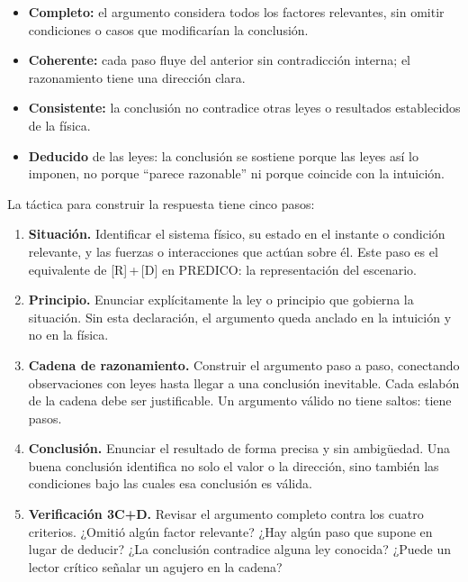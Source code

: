 \documentclass[11pt]{book}
\begin{document}
\medskip
{}
\begin{itemize}
    \item {\bf Completo:} el argumento considera todos los factores relevantes, sin omitir condiciones o casos que modificarían la conclusión.
    \item {\bf Coherente:} cada paso fluye del anterior sin contradicción interna; el razonamiento tiene una dirección clara.
    \item {\bf Consistente:} la conclusión no contradice otras leyes o resultados establecidos de la física.
    \item {\bf Deducido} de las leyes: la conclusión se sostiene porque las leyes así lo imponen, no porque ``parece razonable'' ni porque coincide con la intuición.
\end{itemize}

\medskip
La táctica para construir la respuesta tiene cinco pasos:

\begin{enumerate}
    \item[1.] {\bf Situación.} Identificar el sistema físico, su estado en el instante o condición relevante, y las fuerzas o interacciones que actúan sobre él. Este paso es el equivalente de [R]\,+\,[D] en PREDICO: la representación del escenario.

    \item[2.] {\bf Principio.} Enunciar explícitamente la ley o principio que gobierna la situación. Sin esta declaración, el argumento queda anclado en la intuición y no en la física.

    \item[3.] {\bf Cadena de razonamiento.} Construir el argumento paso a paso, conectando observaciones con leyes hasta llegar a una conclusión inevitable. Cada eslabón de la cadena debe ser justificable. Un argumento válido no tiene saltos: tiene pasos.

    \item[4.] {\bf Conclusión.} Enunciar el resultado de forma precisa y sin ambigüedad. Una buena conclusión identifica no solo el valor o la dirección, sino también las condiciones bajo las cuales esa conclusión es válida.

    \item[5.] {\bf Verificación 3C+D.} Revisar el argumento completo contra los cuatro criterios. ¿Omitió algún factor relevante? ¿Hay algún paso que supone en lugar de deducir? ¿La conclusión contradice alguna ley conocida? ¿Puede un lector crítico señalar un agujero en la cadena?
\end{enumerate}
\end{document}
